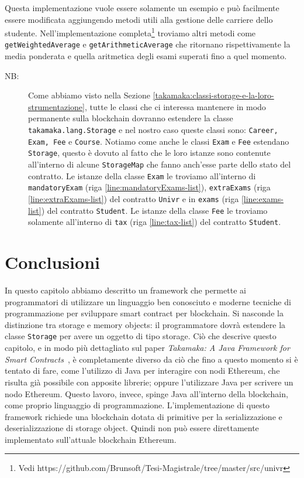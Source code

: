 Questa implementazione vuole essere solamente un esempio e può facilmente essere modificata aggiungendo metodi utili alla gestione delle carriere dello studente. Nell'implementazione completa\footnote{Vedi https://github.com/Brunsoft/Tesi-Magistrale/tree/master/src/univr} troviamo altri metodi come \lstinline|getWeightedAverage| e \lstinline|getArithmeticAverage| che ritornano rispettivamente la media ponderata e quella aritmetica degli esami superati fino a quel momento. 

\begin{description}
	\item[NB:] Come abbiamo visto nella Sezione \ref{takamaka:classi-storage-e-la-loro-strumentazione}, tutte le classi che ci interessa mantenere in modo permanente sulla blockchain dovranno estendere la classe \lstinline|takamaka.lang.Storage| e nel nostro caso queste classi sono: \lstinline|Career, Exam, Fee| e \lstinline|Course|. Notiamo come anche le classi \lstinline|Exam| e \lstinline|Fee| estendano \lstinline|Storage|, questo è dovuto al fatto che le loro istanze sono contenute all'interno di alcune \lstinline|StorageMap| che fanno anch'esse parte dello stato del contratto. Le istanze della classe \lstinline|Exam| le troviamo all'interno di \lstinline|mandatoryExam| (riga \ref{line:mandatoryExams-list}), \lstinline|extraExams| (riga \ref{line:extraExams-list}) del contratto \lstinline|Univr| e in \lstinline|exams| (riga \ref{line:exams-list}) del contratto \lstinline|Student|. Le istanze della classe \lstinline|Fee| le troviamo solamente all'interno di \lstinline|tax| (riga \ref{line:tax-list}) del contratto \lstinline|Student|.
\end{description}

\section{Conclusioni} \label{takamaka:conclusioni}
In questo capitolo abbiamo descritto un framework che permette ai programmatori di utilizzare un linguaggio ben conosciuto e moderne tecniche di programmazione per sviluppare smart contract per blockchain. Si nasconde la distinzione tra storage e memory objects: il programmatore dovrà estendere la classe \lstinline|Storage| per avere un oggetto di tipo storage. Ciò che descrive questo capitolo, e in modo più dettagliato sul paper \textit{Takamaka: A Java Framework for Smart Contracts}~\cite{paper-takamaka:spoto}, è completamente diverso da ciò che fino a questo momento si è tentato di fare, come l'utilizzo di Java per interagire con nodi Ethereum, che risulta già possibile con apposite librerie; oppure l'utilizzare Java per scrivere un nodo Ethereum. Questo lavoro, invece, spinge Java all'interno della blockchain, come proprio linguaggio di programmazione. L'implementazione di questo framework richiede una blockchain dotata di primitive per la serializzazione e deserializzazione di storage object. Quindi non può essere direttamente implementato sull'attuale blockchain Ethereum.